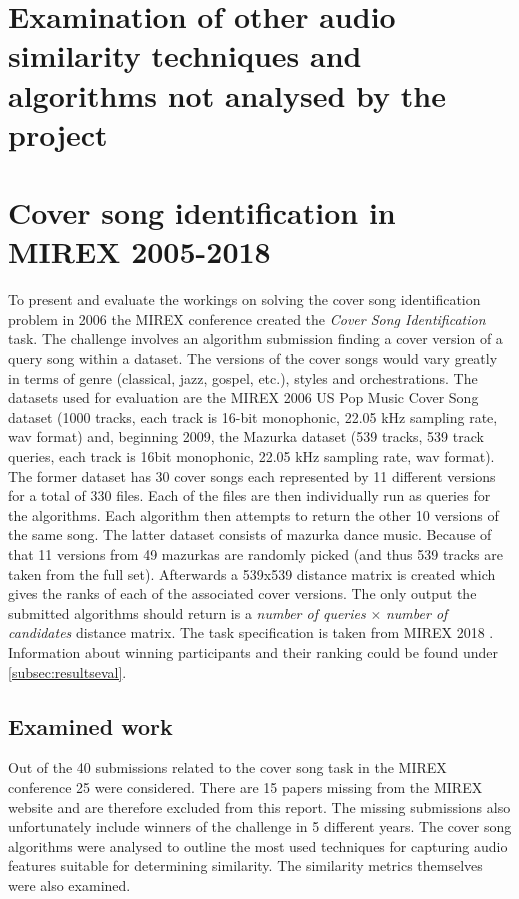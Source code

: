 \section{Examination of other audio similarity techniques and algorithms not analysed by the project}
\label{sec:othersimilaritytechinques}
\section{Cover song identification in MIREX 2005-2018}
\label{sec:scientificpaper}

To present and evaluate the workings on solving the cover song identification
problem in 2006 the MIREX conference created the \textit{Cover Song
Identification} task. The challenge involves an algorithm submission finding a
cover version of a query song within a dataset. The versions of the cover songs
would vary greatly in terms of genre (classical, jazz, gospel, etc.), styles and
orchestrations. The datasets used for evaluation are the MIREX 2006 US Pop Music
Cover Song dataset (1000 tracks, each track is 16-bit monophonic, 22.05 kHz
sampling rate, wav format) and, beginning 2009, the Mazurka dataset (539 tracks,
539 track queries, each track is 16bit monophonic, 22.05 kHz sampling rate, wav
format). The former dataset has 30 cover songs each represented by 11 different
versions for a total of 330 files. Each of the files are then individually run
as queries for the algorithms. Each algorithm then attempts to return the other
10 versions of the same song.  The latter dataset consists of mazurka dance
music. Because of that 11 versions from 49 mazurkas are randomly picked (and
thus 539 tracks are taken from the full set). Afterwards a 539x539 distance
matrix is created which gives the ranks of each of the associated cover
versions. The only output the submitted algorithms should return is a
\textit{number of queries} $\times$ \textit{number of candidates} distance
matrix. The task specification is taken from MIREX 2018 \cite{mirex:2018}.
Information about winning participants and their ranking could be found under
\ref{subsec:resultseval}.

\subsection{Examined work}
\label{subsec:examinedwork}
Out of the 40 submissions related to the cover song task in the MIREX conference
25 were considered. There are 15 papers missing from the MIREX website and are
therefore excluded from this report. The missing submissions also unfortunately
include winners of the challenge in 5 different years. The cover song algorithms
were analysed to outline the most used techniques for capturing audio features
suitable for determining similarity. The similarity metrics themselves were also
examined.

